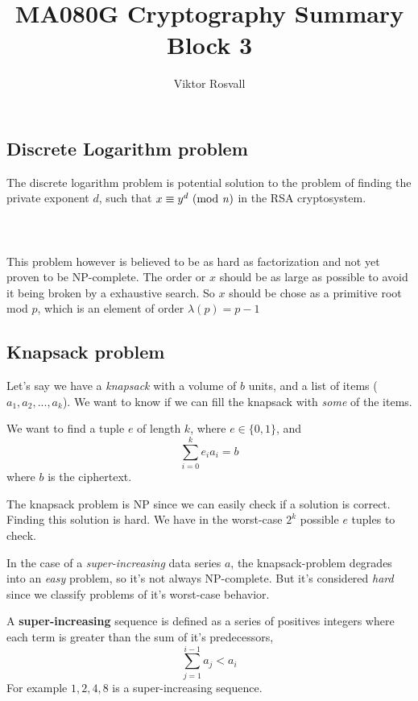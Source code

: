 \documentclass[12pt]{article}
\title{MA080G Cryptography Summary Block 3}
\author{Viktor Rosvall}
\begin{document}
	\maketitle
	
	
	\subsection*{Discrete Logarithm problem \cite{discrete-log}}
	The discrete logarithm problem is potential solution to the problem of finding the private exponent $d$, such that $x \equiv y^d \text{ (mod \textit{n})}$ in the RSA cryptosystem.
	\\
	\\
	\\
	\\
	This problem however is believed to be as hard as factorization and not yet proven to be NP-complete. The order or $x$ should be as large as possible to avoid it being broken by a exhaustive search. So $x$ should be chose as a primitive root mod $p$, which is an element of order $\lambda(p) = p-1$
	
	
	\subsection*{Knapsack problem \cite{knapsack-problem}}
	Let's say we have a \textit{knapsack} with a volume of $b$ units, and a list of items ($a_1, a_2,...,a_k$). We want to know if we can fill the knapsack with \textit{some} of the items. 
	
	We want to find a tuple $e$ of length $k$, where $e \in \{0,1\}$, and 
	$$
	\sum_{i = 0}^{k}e_ia_i = b
	$$
	where $b$ is the ciphertext.
	
	The knapsack problem is NP since we can easily check if a solution is correct. Finding this solution is hard. We have in the worst-case $2^k$ possible $e$ tuples to check. 
	
	In the case of a \textit{super-increasing} data series $a$, the knapsack-problem degrades into an \textit{easy} problem, so it's not always NP-complete. But it's considered \textit{hard} since we classify problems of it's worst-case behavior. 
	
	A \textbf{super-increasing} sequence is defined as a series of positives integers where each term is greater than the sum of it's predecessors, 
	$$
	\sum_{j=1}^{i-1}a_j<a_i
	$$
	For example $1,2,4,8$ is a super-increasing sequence.
	
\end{document}
